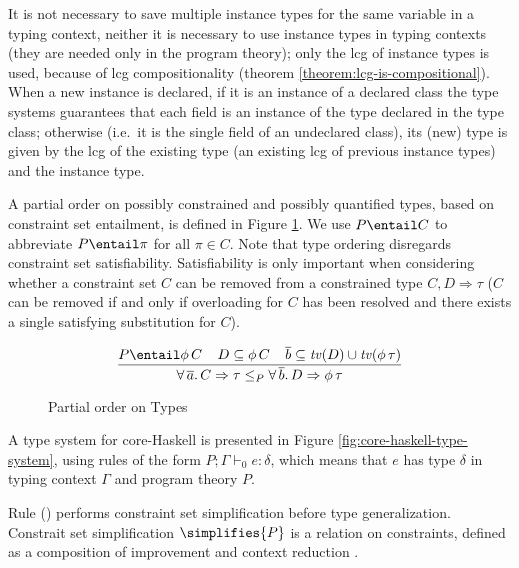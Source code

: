It is not necessary to save multiple instance types for the same
variable in a typing context, neither it is necessary to use instance
types in typing contexts (they are needed only in the program theory);
only the lcg of instance types is used, because of lcg
compositionality (theorem \ref{theorem:lcg-is-compositional}). When a
new instance is declared, if it is an instance of a declared class the
type systems guarantees that each field is an instance of the type
declared in the type class; otherwise (i.e.~it is the single field of
an undeclared class), its (new) type is given by the lcg of the
existing type (an existing lcg of previous instance types) and the
instance type.

A partial order on possibly constrained and possibly quantified types,
based on constraint set entailment, is defined in Figure
\ref{fig:type-partial-order}. We use $P \entail C$ to abbreviate
$P\entail \pi$ for all $\pi\in C$.  Note that type ordering disregards
constraint set satisfiability.  Satisfiability is only important when
considering whether a constraint set $C$ can be removed from a
constrained type $C,D \Rightarrow \tau$ ($C$ can be removed if and
only if overloading for $C$ has been resolved and there exists a
single satisfying substitution for
$C$)\cite{JBCS-Ambiguity-and-constrained-polymorphism}.

\begin{figure}
   \[ \begin{array}{ccc}
   	\displaystyle\frac
          {P \entail \phi\,C \:\:\:\:\: D \subseteq \phi\,C \:\:\:\:\: \overline{b} \subseteq \tv(D) \cup \tv(\phi\,\tau) }
          {\forall\,\overline{a}.\,C \Rightarrow \tau \leq_P \forall\,\overline{b}.\,D \Rightarrow \phi\,\tau}
  \end{array} \]
\caption{Partial order on Types}
\label{fig:type-partial-order}
\end{figure}

A type system for core-Haskell is presented in Figure
\ref{fig:core-haskell-type-system}, using rules of the form $P;\Gamma
\vdash_0 e:\delta$, which means that $e$ has type $\delta$ in typing
context $\Gamma$ and program theory $P$.

Rule (\LET) performs constraint set simplification before type
generalization. Constrait set simplification $\simplifies{P}$ is a
relation on cons\-traints, defined as a composition of improvement and
context reduction \cite{JBCS-Ambiguity-and-constrained-polymorphism}.


